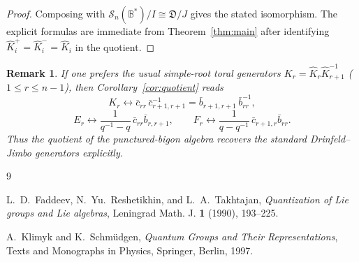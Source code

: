 \documentclass[11pt]{article}
\newtheorem{remark}[theorem]{Remark}
\newcommand{\bcS}{\mathcal S}
\newcommand{\fB}{\mathbb B}
\begin{document}
\begin{proof}
Composing with \(\bcS_n(\fB^\ast)/I\cong \mathfrak D/J\) gives the stated isomorphism. The explicit formulas are immediate from Theorem~\ref{thm:main} after identifying \(\hat K_i^+=\hat K_i^-=\hat K_i\) in the quotient.
\end{proof}

\begin{remark}
If one prefers the usual simple-root toral generators \(K_r=\hat K_r\hat K_{r+1}^{-1}\) (\(1\le r\le n-1\)), then Corollary~\ref{cor:quotient} reads
\[
K_r\longleftrightarrow
\bar c_{rr}\,\bar c_{r+1,r+1}^{-1}
=
\bar b_{r+1,r+1}\,\bar b_{rr}^{-1},
\]
\[
E_r\longleftrightarrow \frac{1}{q^{-1}-q}\,\bar c_{rr}\bar b_{r,r+1},
\qquad
F_r\longleftrightarrow \frac{1}{q-q^{-1}}\,\bar c_{r+1,r}\bar b_{rr}.
\]
Thus the quotient of the punctured-bigon algebra recovers the standard Drinfeld--Jimbo generators explicitly.
\end{remark}

\begin{thebibliography}{9}

L.~D.~Faddeev, N.~Yu.~Reshetikhin, and L.~A.~Takhtajan,
\emph{Quantization of Lie groups and Lie algebras},
Leningrad Math. J. \textbf{1} (1990), 193--225.

A.~Klimyk and K.~Schm\"udgen,
\emph{Quantum Groups and Their Representations},
Texts and Monographs in Physics, Springer, Berlin, 1997.

\end{thebibliography}
\end{document}

